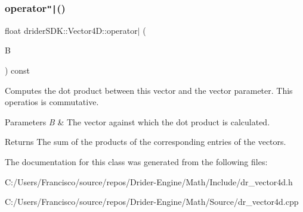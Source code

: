 \subsubsection{\texorpdfstring{operator\texttt{"|}()}{operator|()}}
{\footnotesize\ttfamily float drider\+S\+D\+K\+::\+Vector4\+D\+::operator$\vert$ (\begin{DoxyParamCaption}\item[{const \hyperlink{classdrider_s_d_k_1_1_vector4_d}{Vector4D} \&}]{B }\end{DoxyParamCaption}) const}

Computes the dot product between this vector and the vector parameter. This operatios is commutative.


\begin{DoxyParams}{Parameters}
{\em B} & The vector against which the dot product is calculated.\\
\hline
\end{DoxyParams}
\begin{DoxyReturn}{Returns}
The sum of the products of the corresponding entries of the vectors. 
\end{DoxyReturn}


The documentation for this class was generated from the following files\+:\begin{DoxyCompactItemize}
\item 
C\+:/\+Users/\+Francisco/source/repos/\+Drider-\/\+Engine/\+Math/\+Include/dr\+\_\+vector4d.\+h\item 
C\+:/\+Users/\+Francisco/source/repos/\+Drider-\/\+Engine/\+Math/\+Source/dr\+\_\+vector4d.\+cpp\end{DoxyCompactItemize}
